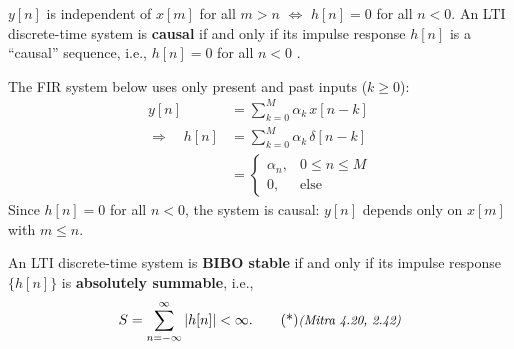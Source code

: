 \documentclass[handout_subfiles_root.tex]{subfiles}
\begin{document}
\begin{defbox}[title={Causality}]
$y[n]$ is independent of $x[m]$ for all $m > n$ $\iff$ $h[n] = 0$ for all
$n < 0$.\footnotemark{} An LTI discrete-time system is \textbf{causal} if and only if its
impulse response $h[n]$ is a ``causal'' sequence, i.e., $h[n]=0$ for all
$n<0$ .
\end{defbox}

\begin{examplebox}[title={Example}]
The FIR system below uses only present and past inputs ($k \ge 0$):
\begin{align*}
  y[n] &= \sum_{k=0}^{M} \alpha_k\,x[n-k] \\
  \Longrightarrow\quad h[n] &= \sum_{k=0}^{M}\alpha_k\,\delta[n-k] \\
  &= \begin{cases}\alpha_n, & 0\le n\le M \\ 0, & \text{else}\end{cases}
\end{align*}
\noindent Since $h[n]=0$ for all $n<0$, the system is causal: $y[n]$ depends only on
$x[m]$ with $m \le n$.
\end{examplebox}


\begin{defbox}[title={\HandoutTitleWithFnmark{BIBO Stability}}]
An LTI discrete-time system is \textbf{BIBO stable} if and only if its
impulse response $\{h[n]\}$ is \textbf{absolutely summable}, i.e.,
\begin{equation}
S = \sum_{n=-\infty}^{\infty} |h[n]| < \infty.\MitraTag{4.20,\ 2.42}
\end{equation}
\end{defbox}
\end{document}
